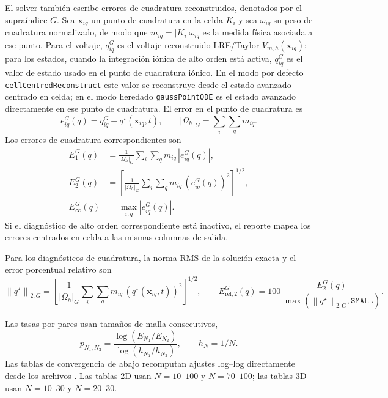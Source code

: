 \documentclass[11pt,a4paper]{article}
\newcommand{\code}[1]{\texttt{\small #1}}
\newcommand{\norm}[1]{\left\lVert #1 \right\rVert}
\begin{document}
El solver también escribe errores de cuadratura reconstruidos, denotados por el supraíndice
$G$. Sea $\mathbf{x}_{iq}$ un punto de cuadratura en la celda $K_i$ y sea $\omega_{iq}$ su peso
de cuadratura normalizado, de modo que $m_{iq}=|K_i|\omega_{iq}$ es la medida física asociada
a ese punto. Para el voltaje, $q^G_{iq}$ es el voltaje reconstruido LRE/Taylor
$V_{m,h}(\mathbf{x}_{iq})$; para los estados, cuando la integración iónica de alto orden está
activa, $q^G_{iq}$ es el valor de estado usado en el punto de cuadratura iónico. En el modo por
defecto \code{cellCentredReconstruct} este valor se reconstruye desde el estado avanzado
centrado en celda; en el modo heredado \code{gaussPointODE} es el estado avanzado directamente
en ese punto de cuadratura. El error en el punto de cuadratura es
\begin{equation}
  e_{iq}^{G}(q)=q^G_{iq}-q^\star(\mathbf{x}_{iq},t),
  \qquad
  |\Omega_h|_G=\sum_i\sum_q m_{iq}.
\end{equation}
Los errores de cuadratura correspondientes son
\begin{align}
  E_{1}^{G}(q)
  &=
  \frac{1}{|\Omega_h|_G}
  \sum_i\sum_q m_{iq}\,|e_{iq}^{G}(q)|,
  \label{eq:gauss-l1-error}
  \\
  E_{2}^{G}(q)
  &=
  \left[
  \frac{1}{|\Omega_h|_G}
  \sum_i\sum_q m_{iq}\,\left(e_{iq}^{G}(q)\right)^2
  \right]^{1/2},
  \label{eq:gauss-l2-error}
  \\
  E_{\infty}^{G}(q)
  &=
  \max_{i,q} |e_{iq}^{G}(q)|.
  \label{eq:gauss-linf-error}
\end{align}
Si el diagnóstico de alto orden correspondiente está inactivo, el reporte mapea los errores
centrados en celda a las mismas columnas de salida.

Para los diagnósticos de cuadratura, la norma RMS de la solución exacta y el error porcentual
relativo son
\begin{equation}
  \norm{q^\star}_{2,G}
  =
  \left[
  \frac{1}{|\Omega_h|_G}
  \sum_i\sum_q m_{iq}\,
  \left(q^\star(\mathbf{x}_{iq},t)\right)^2
  \right]^{1/2},
  \qquad
  E_{\mathrm{rel},2}^{G}(q)
  =
  100\,\frac{E_2^G(q)}{\max(\norm{q^\star}_{2,G},\texttt{SMALL})}.
\end{equation}

Las tasas por pares usan tamaños de malla consecutivos,
\begin{equation}
p_{N_1,N_2} = \frac{\log(E_{N_1}/E_{N_2})}{\log(h_{N_1}/h_{N_2})}, \qquad h_N=1/N.
\end{equation}
Las tablas de convergencia de abajo recomputan ajustes log--log directamente desde los
archivos . Las tablas 2D usan $N=10$--$100$ y $N=70$--$100$; las tablas 3D
usan $N=10$--$30$ y $N=20$--$30$.
\end{document}
